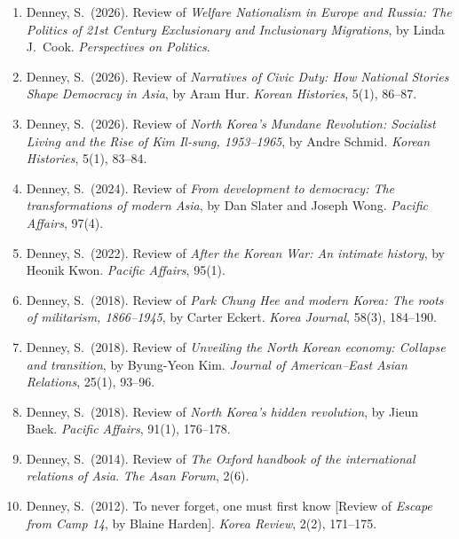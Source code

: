\documentclass[11pt, a4paper]{article}
\begin{document}
\begin{enumerate}[itemsep=0.15em]
  \item Denney, S.\ (2026). Review of \textit{Welfare Nationalism in Europe and Russia: The Politics of 21st Century Exclusionary and Inclusionary Migrations}, by Linda J.\ Cook. \textit{Perspectives on Politics}.

  \item Denney, S.\ (2026). Review of \textit{Narratives of Civic Duty: How National Stories Shape Democracy in Asia}, by Aram Hur. \textit{Korean Histories}, 5(1), 86--87.

  \item Denney, S.\ (2026). Review of \textit{North Korea's Mundane Revolution: Socialist Living and the Rise of Kim Il-sung, 1953--1965}, by Andre Schmid. \textit{Korean Histories}, 5(1), 83--84.

  \item Denney, S.\ (2024). Review of \textit{From development to democracy: The transformations of modern Asia}, by Dan Slater and Joseph Wong. \textit{Pacific Affairs}, 97(4).

  \item Denney, S.\ (2022). Review of \textit{After the Korean War: An intimate history}, by Heonik Kwon. \textit{Pacific Affairs}, 95(1).

  \item Denney, S.\ (2018). Review of \textit{Park Chung Hee and modern Korea: The roots of militarism, 1866--1945}, by Carter Eckert. \textit{Korea Journal}, 58(3), 184--190.

  \item Denney, S.\ (2018). Review of \textit{Unveiling the North Korean economy: Collapse and transition}, by Byung-Yeon Kim. \textit{Journal of American--East Asian Relations}, 25(1), 93--96.

  \item Denney, S.\ (2018). Review of \textit{North Korea's hidden revolution}, by Jieun Baek. \textit{Pacific Affairs}, 91(1), 176--178.

  \item Denney, S.\ (2014). Review of \textit{The Oxford handbook of the international relations of Asia}. \textit{The Asan Forum}, 2(6).

  \item Denney, S.\ (2012). To never forget, one must first know [Review of \textit{Escape from Camp 14}, by Blaine Harden]. \textit{Korea Review}, 2(2), 171--175.
\end{enumerate}
\end{document}

